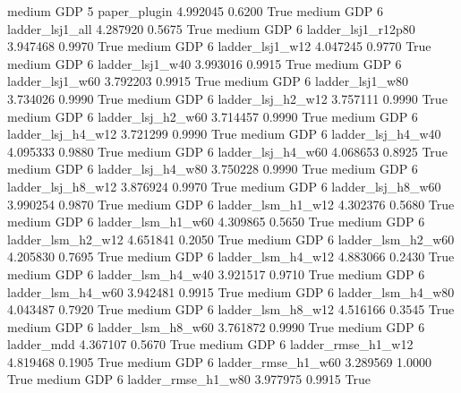     medium      GDP                 5           paper_plugin   4.992045      0.6200    True
    medium      GDP                 6        ladder_lsj1_all   4.287920      0.5675    True
    medium      GDP                 6     ladder_lsj1_r12p80   3.947468      0.9970    True
    medium      GDP                 6        ladder_lsj1_w12   4.047245      0.9770    True
    medium      GDP                 6        ladder_lsj1_w40   3.993016      0.9915    True
    medium      GDP                 6        ladder_lsj1_w60   3.792203      0.9915    True
    medium      GDP                 6        ladder_lsj1_w80   3.734026      0.9990    True
    medium      GDP                 6      ladder_lsj_h2_w12   3.757111      0.9990    True
    medium      GDP                 6      ladder_lsj_h2_w60   3.714457      0.9990    True
    medium      GDP                 6      ladder_lsj_h4_w12   3.721299      0.9990    True
    medium      GDP                 6      ladder_lsj_h4_w40   4.095333      0.9880    True
    medium      GDP                 6      ladder_lsj_h4_w60   4.068653      0.8925    True
    medium      GDP                 6      ladder_lsj_h4_w80   3.750228      0.9990    True
    medium      GDP                 6      ladder_lsj_h8_w12   3.876924      0.9970    True
    medium      GDP                 6      ladder_lsj_h8_w60   3.990254      0.9870    True
    medium      GDP                 6      ladder_lsm_h1_w12   4.302376      0.5680    True
    medium      GDP                 6      ladder_lsm_h1_w60   4.309865      0.5650    True
    medium      GDP                 6      ladder_lsm_h2_w12   4.651841      0.2050    True
    medium      GDP                 6      ladder_lsm_h2_w60   4.205830      0.7695    True
    medium      GDP                 6      ladder_lsm_h4_w12   4.883066      0.2430    True
    medium      GDP                 6      ladder_lsm_h4_w40   3.921517      0.9710    True
    medium      GDP                 6      ladder_lsm_h4_w60   3.942481      0.9915    True
    medium      GDP                 6      ladder_lsm_h4_w80   4.043487      0.7920    True
    medium      GDP                 6      ladder_lsm_h8_w12   4.516166      0.3545    True
    medium      GDP                 6      ladder_lsm_h8_w60   3.761872      0.9990    True
    medium      GDP                 6             ladder_mdd   4.367107      0.5670    True
    medium      GDP                 6     ladder_rmse_h1_w12   4.819468      0.1905    True
    medium      GDP                 6     ladder_rmse_h1_w60   3.289569      1.0000    True
    medium      GDP                 6     ladder_rmse_h1_w80   3.977975      0.9915    True
